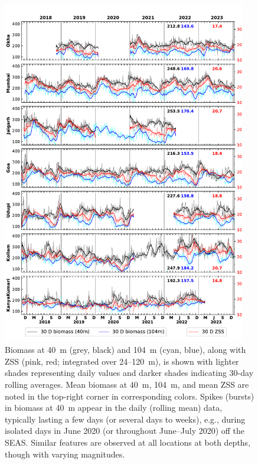 \documentclass[authoryear,review,11pt]{elsarticle}
\begin{document}
\begin{figure}[htbp]
	\centering
	\includegraphics[width=0.95\textwidth]{./figures/ss_biomass_40m_104m.pdf} 
	\captionsetup{justification=justified,font=footnotesize,skip=0.05\baselineskip,width=\textwidth}
	\caption{Biomass at 40~m (grey, black) and 104~m (cyan, blue), along with ZSS (pink, red; integrated over 24--120~m), is shown with lighter shades representing daily values and darker shades indicating 30-day rolling averages. Mean biomass at 40~m, 104~m, and mean ZSS are noted in the top-right corner in corresponding colors. Spikes (bursts) in biomass at 40~m appear in the daily (rolling mean) data, typically lasting a few days (or several days to weeks), e.g., during isolated days in June 2020 (or throughout June--July 2020) off the SEAS. Similar features are observed at all locations at both depths, though with varying magnitudes.}
	\label{fig:ss_biomass_40m_104m}
\end{figure}
\end{document}
